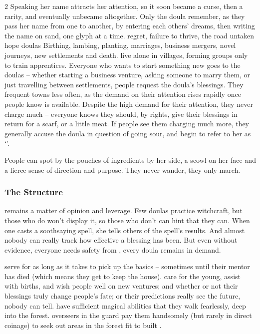 \begin{multicols}{2}
{  Speaking her name attracts her attention, so it soon became a curse, then a rarity, and eventually unbecame altogether.
  Only the \gls{doula} remember, as they pass her name from one to another, by entering each others' dreams, then writing the name on sand, one glyph at a time.}%
  {regret, failure to thrive, the road untaken}%
  {hope}%
  {\Glspl{doula}}%
  {
    Birthing, lambing, planting, marriages, business mergers, novel journeys, new settlements and death.
  }%
live alone in \glspl{village}, forming groups only to train apprentices.
Everyone who wants to start something new goes to the \glspl{doula} -- whether starting a business venture, asking someone to marry them, or just travelling between settlements, people request the \gls{doula}'s blessings.
They frequent towns less often, as the demand on their attention rises rapidly once people know  is available.
Despite the high demand for their attention, they never charge much -- everyone knows they should, by rights, give their blessings in return for a scarf, or a little meat.
If people see them charging much more, they generally accuse the \gls{doula} in question of going sour, and begin to refer to her as `'.

People can spot  by the pouches of \glspl{ingredient} by her side, a scowl on her face and a fierce sense of direction and purpose.
They never wander, they only march.

\subsubsection{The Structure}
remains a matter of opinion and leverage.
Few \glspl{doula} practice \gls{witchcraft}, but those who do won't display it, so those who don't can hint that they can.
When one casts a soothsaying spell, she tells others of the spell's results.
And almost nobody can really track how effective a blessing has been.
But even without evidence, everyone needs safety from \hphantom{Nulla}, every \gls{doula} remains in demand.

\begin{description}
  serve for as long as it takes to pick up the basics -- sometimes until their mentor has died (which means they get to keep the house).
  care for the young, assist with births, and wish people well on new ventures; and whether or not their blessings truly change people's fate; or their predictions really see the future, nobody can tell.
  have sufficient magical abilities that they walk fearlessly, deep into the forest.
  \Glspl{overseer} in the \gls{guard} pay them handsomely (but rarely in direct coinage) to seek out areas in the forest fit to built .


\end{description}
\end{multicols}
